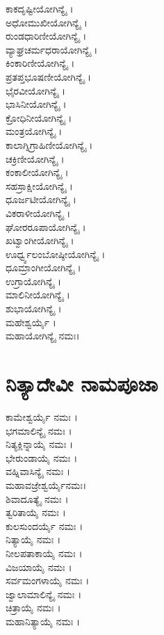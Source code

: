 \begin{multicols}{2}
ಕಾಕದೃಷ್ಟೀಯೋಗಿನ್ಯೈ ।\\
ಅಧೋಮುಖೀಯೋಗಿನ್ಯೈ ।\\
ರುಂಡಧಾರಿಣೀಯೋಗಿನ್ಯೈ ।\\
ವ್ಯಾಘ್ರಚರ್ಮಧರಾಯೋಗಿನ್ಯೈ ।\\
ಕಿಂಕಾರಿಣೀಯೋಗಿನ್ಯೈ ।\\
ಪ್ರತಪ್ತಭೂಷಣೀಯೋಗಿನ್ಯೈ ।\\
ಭೈರವೀಯೋಗಿನ್ಯೈ ।\\
ಭಾಸಿನೀಯೋಗಿನ್ಯೈ ।\\
ಕ್ರೋಧಿನೀಯೋಗಿನ್ಯೈ ।\\
ಮಂತ್ರಯೋಗಿನ್ಯೈ ।\\
ಕಾಲಾಗ್ನಿಗ್ರಾಹಿಣೀಯೋಗಿನ್ಯೈ ।\\
ಚಕ್ರಿಣೀಯೋಗಿನ್ಯೈ ।\\
ಕಂಕಾಲೀಯೋಗಿನ್ಯೈ ।\\
ಸಹಸ್ರಾಕ್ಷೀಯೋಗಿನ್ಯೈ ।\\
ಧೂರ್ಜಟೀಯೋಗಿನ್ಯೈ ।\\
ವಿಕರಾಳೀಯೋಗಿನ್ಯೈ ।\\
ಘೋರರೂಪಾಯೋಗಿನ್ಯೈ ।\\
ಖಟ್ವಾಂಗೀಯೋಗಿನ್ಯೈ ।\\
ಊರ್ಧ್ವ್ವಲಂಬೋಷ್ಠೀಯೋಗಿನ್ಯೈ ।\\
ಧೂಮ್ರಾಂಗೀಯೋಗಿನ್ಯೈ ।\\
ಉಗ್ರಾಯೋಗಿನ್ಯೈ ।\\
ಮಾಲಿನೀಯೋಗಿನ್ಯೈ ।\\
ಶುಭಾಯೋಗಿನ್ಯೈ ।\\
ಮಹೇಶ್ವರ್ಯೈ ।\\
ಮಹಾಯೋಗಿನ್ಯೈ ನಮಃ।
\end{multicols}
\section{ನಿತ್ಯಾದೇವೀ ನಾಮಪೂಜಾ}
\begin{multicols}{2}
 ಕಾಮೇಶ್ವರ್ಯೈ ನಮಃ ।\\
 ಭಗಮಾಲಿನ್ಯೈ ನಮಃ ।\\
 ನಿತ್ಯಕ್ಲಿನ್ನಾಯೈ ನಮಃ ।\\
 ಭೇರುಂಡಾಯೈ ನಮಃ ।\\
 ವಹ್ನಿವಾಸಿನ್ಯೈ ನಮಃ ।\\
 ಮಹಾವಜ್ರೇಶ್ವರ್ಯೈನಮಃ।\\
 ಶಿವಾದೂತ್ಯೈ ನಮಃ ।\\
 ತ್ವರಿತಾಯೈ ನಮಃ ।\\
 ಕುಲಸುಂದರ್ಯೈ ನಮಃ ।\\
 ನಿತ್ಯಾಯೈ ನಮಃ ।\\
 ನೀಲಪತಾಕಾಯೈ ನಮಃ ।\\
 ವಿಜಯಾಯೈ ನಮಃ ।\\
 ಸರ್ವಮಂಗಳಾಯೈ ನಮಃ ।\\
 ಜ್ವಾಲಾಮಾಲಿನ್ಯೈ ನಮಃ ।\\
 ಚಿತ್ರಾಯೈ ನಮಃ ।\\
 ಮಹಾನಿತ್ಯಾಯೈ ನಮಃ ।
\end{multicols}
